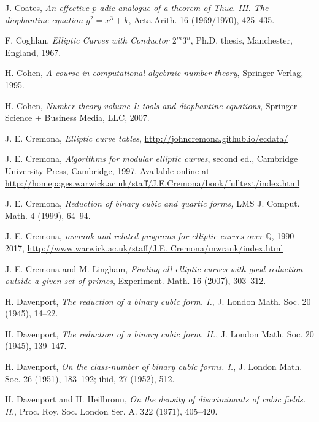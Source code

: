 \begin{thebibliography}{}
J. Coates,
\emph{An effective $p$-adic analogue of a theorem of Thue. III. The diophantine equation $y^2=x^3+k$},
Acta Arith. 16 (1969/1970), 425--435.


F. Coghlan,
\emph{Elliptic Curves with Conductor $2^m3^n$},
Ph.D. thesis, Manchester, England, 1967.

H. Cohen,
\emph{A course in computational algebraic number theory}, 
Springer Verlag, 1995.

H. Cohen,
\emph{Number theory volume I: tools and diophantine equations}, 
Springer Science + Business Media, LLC, 2007.

J. E. Cremona,
\emph{Elliptic curve tables}, 
\url{http://johncremona.github.io/ecdata/}

J. E. Cremona,
\emph{Algorithms for modular elliptic curves}, second ed.,
Cambridge University Press, Cambridge, 1997. Available online at 
\url{http://homepages.warwick.ac.uk/staff/J.E.Cremona/book/fulltext/index.html}

J. E. Cremona,
\emph{Reduction of binary cubic and quartic forms,}
LMS J. Comput. Math. 4 (1999), 64--94.

J. E. Cremona, 
\emph{mwrank and related programs for elliptic curves over $\mathbb{Q}$}, 1990--2017,
 \url{http://www.warwick.ac.uk/staff/J.E. Cremona/mwrank/index.html}
  
J. E. Cremona and M. Lingham,
\emph{Finding all elliptic curves with good reduction outside a given set of primes},
Experiment. Math. 16 (2007), 303--312.

H. Davenport,
\emph{The reduction of a binary cubic form. I.},
J. London Math. Soc. 20 (1945), 14--22.

H. Davenport,
\emph{The reduction of a binary cubic form. II.},
J. London Math. Soc. 20 (1945), 139--147.

H. Davenport,
\emph{On the class-number of binary cubic forms. I.},
J. London Math. Soc. 26 (1951), 183--192; ibid,  27 (1952), 512.

H. Davenport and H. Heilbronn,
\emph{On the density of discriminants of cubic fields. II.},
Proc. Roy. Soc. London Ser. A. 322 (1971), 405--420.


\end{thebibliography}
